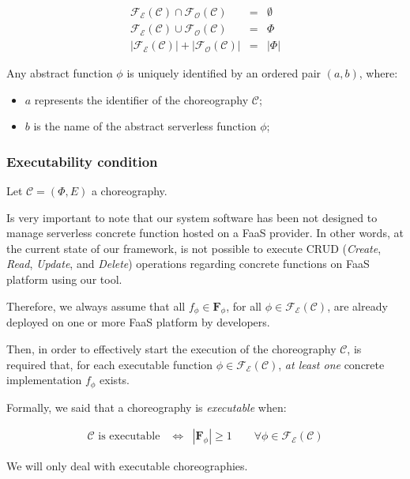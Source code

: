 \documentclass[12pt,a4paper]{report}
\begin{document}
\begin{eqnarray}
	\mathscr{F_E}(\mathcal{C}) \cap \mathscr{F_O}(\mathcal{C}) & = & \emptyset \\
	\mathscr{F_E}(\mathcal{C}) \cup \mathscr{F_O}(\mathcal{C}) & = & \Phi \\
	|\mathscr{F_E}(\mathcal{C})| + |\mathscr{F_O}(\mathcal{C})| &=& |\Phi| 
\end{eqnarray}

Any abstract function $\phi$ is uniquely identified by an ordered pair $(a, b)$, where:
\begin{itemize}
	\item $a$ represents the identifier of the choreography $\mathcal{C}$;
	\item $b$ is the name of the abstract serverless function $\phi$;
\end{itemize}

\subsubsection{Executability condition}

Let $\mathcal{C} = (\Phi,E)$ a choreography.

Is very important to note that our system software has been not designed to manage serverless concrete function hosted on a FaaS provider. In other words, at the current state of our framework, is not possible to execute CRUD (\textit{Create}, \textit{Read}, \textit{Update}, and \textit{Delete}) operations regarding concrete functions on FaaS platform using our tool.

Therefore, we always assume that all $f_{\phi} \in \textbf{F}_{\phi}$, for all $\phi \in \mathscr{F_E}(\mathcal{C})$, are already deployed on one or more FaaS platform by developers. 

Then, in order to effectively start the execution of the choreography $\mathcal{C}$, is required that, for each executable function $\phi \in \mathscr{F_E}(\mathcal{C})$, \textit{at least one} concrete implementation $f_{\phi}$ exists.

Formally, we said that a choreography is \textit{executable} when: 

\begin{eqnarray}
	\label{eqn:SchedulabilityConditionOne}
	\mathcal{C} \text{ is executable } & \Leftrightarrow & |\textbf{F}_{\phi}| \geq 1 \qquad \forall \phi \in \mathscr{F_E}(\mathcal{C})
\end{eqnarray}

We will only deal with executable choreographies.
\end{document}
